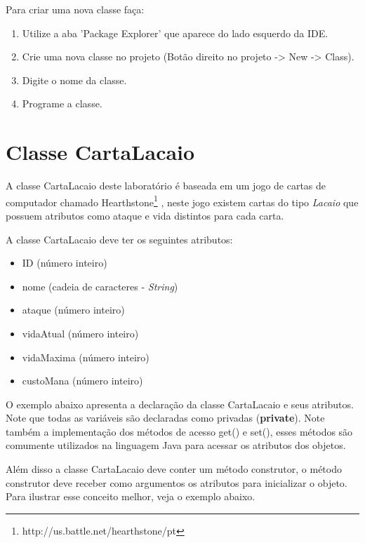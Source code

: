 \documentclass[10pt]{article}
\begin{document}
Para criar uma nova classe faça:
\begin{enumerate}
	\item Utilize a aba 'Package Explorer' que aparece do lado esquerdo da IDE.
    \item Crie uma nova classe no projeto (Botão direito no projeto -> New -> Class).
    \item Digite o nome da classe.
    \item Programe a classe.
\end{enumerate}

\section{Classe CartaLacaio}

A classe CartaLacaio deste laboratório é baseada em um jogo de cartas de computador chamado Hearthstone\footnote{http://us.battle.net/hearthstone/pt} \textcopyright, neste jogo existem cartas do tipo \emph{Lacaio} que possuem atributos como ataque e vida distintos para cada carta.

A classe CartaLacaio deve ter os seguintes atributos:
\begin{itemize}
    \item ID (número inteiro)
    \item nome (cadeia de caracteres - \emph{String})
    \item ataque (número inteiro)
    \item vidaAtual (número inteiro)
    \item vidaMaxima (número inteiro)
    \item custoMana (número inteiro)
\end{itemize}

O exemplo abaixo apresenta a declaração da classe CartaLacaio e seus atributos. Note que todas as variáveis são declaradas como privadas (\textbf{private}). Note também a implementação dos métodos de acesso get() e set(), esses métodos são comumente utilizados na linguagem Java para acessar os atributos dos objetos.



Além disso a classe CartaLacaio deve conter um método construtor, o método construtor deve receber como argumentos os atributos para inicializar o objeto. Para ilustrar esse conceito melhor, veja o exemplo abaixo.


\end{document}
